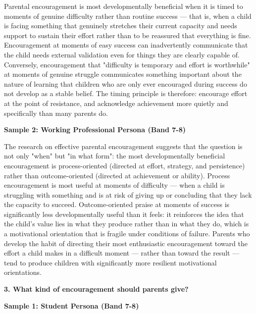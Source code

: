 Parental encouragement is most developmentally beneficial when it is timed to moments of genuine difficulty rather than routine success — that is, when a child is facing something that genuinely stretches their current capacity and needs support to sustain their effort rather than to be reassured that everything is fine. Encouragement at moments of easy success can inadvertently communicate that the child needs external validation even for things they are clearly capable of. Conversely, encouragement that "difficulty is temporary and effort is worthwhile" at moments of genuine struggle communicates something important about the nature of learning that children who are only ever encouraged during success do not develop as a stable belief. The timing principle is therefore: encourage effort at the point of resistance, and acknowledge achievement more quietly and specifically than many parents do.

\textbf{Sample 2: Working Professional Persona (Band 7-8)}

The research on effective parental encouragement suggests that the question is not only "when" but "in what form": the most developmentally beneficial encouragement is process-oriented (directed at effort, strategy, and persistence) rather than outcome-oriented (directed at achievement or ability). Process encouragement is most useful at moments of difficulty — when a child is struggling with something and is at risk of giving up or concluding that they lack the capacity to succeed. Outcome-oriented praise at moments of success is significantly less developmentally useful than it feels: it reinforces the idea that the child's value lies in what they produce rather than in what they do, which is a motivational orientation that is fragile under conditions of failure. Parents who develop the habit of directing their most enthusiastic encouragement toward the effort a child makes in a difficult moment — rather than toward the result — tend to produce children with significantly more resilient motivational orientations.

\separator

\begin{ieltsquestion}
\textbf{3. What kind of encouragement should parents give?}
\end{ieltsquestion}
\textbf{Sample 1: Student Persona (Band 7-8)}

